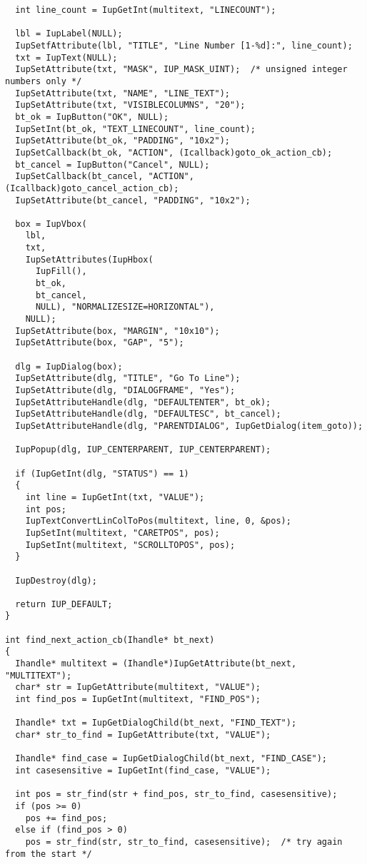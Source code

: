 \documentclass{ctexart}
\begin{document}
\begin{lstlisting}
  int line_count = IupGetInt(multitext, "LINECOUNT");

  lbl = IupLabel(NULL);
  IupSetfAttribute(lbl, "TITLE", "Line Number [1-%d]:", line_count);
  txt = IupText(NULL);
  IupSetAttribute(txt, "MASK", IUP_MASK_UINT);  /* unsigned integer numbers only */
  IupSetAttribute(txt, "NAME", "LINE_TEXT");
  IupSetAttribute(txt, "VISIBLECOLUMNS", "20");
  bt_ok = IupButton("OK", NULL);
  IupSetInt(bt_ok, "TEXT_LINECOUNT", line_count);
  IupSetAttribute(bt_ok, "PADDING", "10x2");
  IupSetCallback(bt_ok, "ACTION", (Icallback)goto_ok_action_cb);
  bt_cancel = IupButton("Cancel", NULL);
  IupSetCallback(bt_cancel, "ACTION", (Icallback)goto_cancel_action_cb);
  IupSetAttribute(bt_cancel, "PADDING", "10x2");

  box = IupVbox(
    lbl,
    txt,
    IupSetAttributes(IupHbox(
      IupFill(),
      bt_ok,
      bt_cancel,
      NULL), "NORMALIZESIZE=HORIZONTAL"),
    NULL);
  IupSetAttribute(box, "MARGIN", "10x10");
  IupSetAttribute(box, "GAP", "5");

  dlg = IupDialog(box);
  IupSetAttribute(dlg, "TITLE", "Go To Line");
  IupSetAttribute(dlg, "DIALOGFRAME", "Yes");
  IupSetAttributeHandle(dlg, "DEFAULTENTER", bt_ok);
  IupSetAttributeHandle(dlg, "DEFAULTESC", bt_cancel);
  IupSetAttributeHandle(dlg, "PARENTDIALOG", IupGetDialog(item_goto));

  IupPopup(dlg, IUP_CENTERPARENT, IUP_CENTERPARENT);

  if (IupGetInt(dlg, "STATUS") == 1)
  {
    int line = IupGetInt(txt, "VALUE");
    int pos;
    IupTextConvertLinColToPos(multitext, line, 0, &pos);
    IupSetInt(multitext, "CARETPOS", pos);
    IupSetInt(multitext, "SCROLLTOPOS", pos);
  }

  IupDestroy(dlg);

  return IUP_DEFAULT;
}

int find_next_action_cb(Ihandle* bt_next)
{
  Ihandle* multitext = (Ihandle*)IupGetAttribute(bt_next, "MULTITEXT");
  char* str = IupGetAttribute(multitext, "VALUE");
  int find_pos = IupGetInt(multitext, "FIND_POS");

  Ihandle* txt = IupGetDialogChild(bt_next, "FIND_TEXT");
  char* str_to_find = IupGetAttribute(txt, "VALUE");

  Ihandle* find_case = IupGetDialogChild(bt_next, "FIND_CASE");
  int casesensitive = IupGetInt(find_case, "VALUE");

  int pos = str_find(str + find_pos, str_to_find, casesensitive);
  if (pos >= 0)
    pos += find_pos;
  else if (find_pos > 0)
    pos = str_find(str, str_to_find, casesensitive);  /* try again from the start */


\end{lstlisting}
\end{document}
